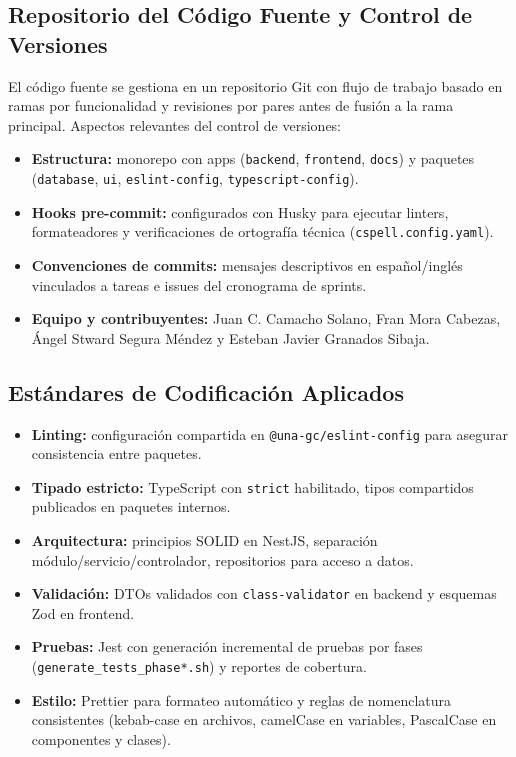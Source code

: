 \subsection{Repositorio del Código Fuente y Control de Versiones}

El código fuente se gestiona en un repositorio Git con flujo de trabajo basado en ramas por funcionalidad y revisiones por pares antes de fusión a la rama principal. Aspectos relevantes del control de versiones:

\begin{itemize}
    \item \textbf{Estructura:} monorepo con apps (\texttt{backend}, \texttt{frontend}, \texttt{docs}) y paquetes (\texttt{database}, \texttt{ui}, \texttt{eslint-config}, \texttt{typescript-config}).
    \item \textbf{Hooks pre-commit:} configurados con Husky para ejecutar linters, formateadores y verificaciones de ortografía técnica (\texttt{cspell.config.yaml}).
    \item \textbf{Convenciones de commits:} mensajes descriptivos en español/inglés vinculados a tareas e issues del cronograma de sprints.
    \item \textbf{Equipo y contribuyentes:} Juan C. Camacho Solano, Fran Mora Cabezas, Ángel Stward Segura Méndez y Esteban Javier Granados Sibaja.
\end{itemize}

\subsection{Estándares de Codificación Aplicados}

\begin{itemize}
    \item \textbf{Linting:} configuración compartida en \texttt{@una-gc/eslint-config} para asegurar consistencia entre paquetes.
    \item \textbf{Tipado estricto:} TypeScript con \texttt{strict} habilitado, tipos compartidos publicados en paquetes internos.
    \item \textbf{Arquitectura:} principios SOLID en NestJS, separación módulo/servicio/controlador, repositorios para acceso a datos.
    \item \textbf{Validación:} DTOs validados con \texttt{class-validator} en backend y esquemas Zod en frontend.
    \item \textbf{Pruebas:} Jest con generación incremental de pruebas por fases (\texttt{generate\_tests\_phase*.sh}) y reportes de cobertura.
    \item \textbf{Estilo:} Prettier para formateo automático y reglas de nomenclatura consistentes (kebab-case en archivos, camelCase en variables, PascalCase en componentes y clases).
\end{itemize}

